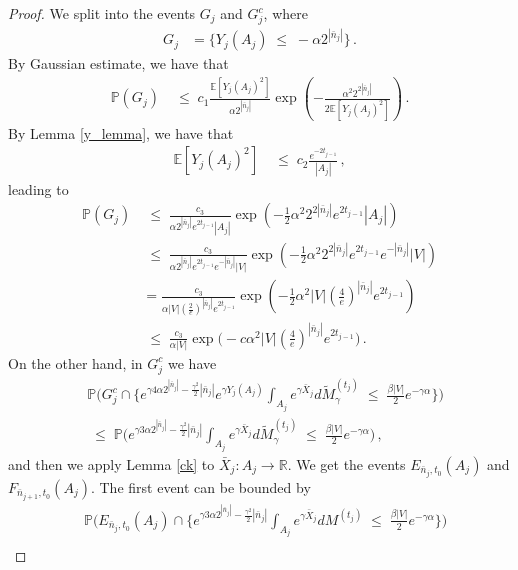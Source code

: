 \documentclass[10pt,a4paper]{amsart}
\newcommand{\E}{\mathbb{E}}
\newcommand{\Pb}{\P}
\newcommand{\R}{\mathbb{R}}
\newcommand{\ab}{|}
\renewcommand{\P}{\mathbb{P}}
\renewcommand{\leq}{\;\leqslant\;}                   %
\renewcommand{\tilde}{\widetilde}          %
\begin{document}
\begin{proof}

We split into the events $G_j$ and $G_j^c$, where
\begin{align*}
G_j &= \{ Y_j(A_j) \leq - \alpha 2^{|\bar n_j|} \}\,.
\end{align*}
By Gaussian estimate, we have that
\begin{align*}
\Pb(G_j) &\leq  c_1 \frac{\E[Y_j(A_j)^2]}{\alpha 2^{|\bar n_j|}} \exp \left( -  \frac{\alpha^2 2^{2|\bar n_j|}}{2 \E[ Y_j(A_j)^2]} \right)\,.
\end{align*}
By Lemma \ref{y_lemma}, we have that
\begin{align*}
\E[ Y_j(A_j)^2] & \leq c_2 \frac{e^{-2 t_{j-1}}}{\ab A_j \ab }\,,
\end{align*}
leading to 
\begin{align*}
\Pb(G_j) &\leq \frac{c_3}{\alpha 2^{|\bar n_j|} e^{2 t_{j-1}} |A_j|} \exp( - \tfrac 12 \alpha^2 2^{2|\bar n_j|} e^{2t_{j-1}} |A_j| ) \\
& \leq \frac{c_3}{\alpha 2^{|\bar n_j|} e^{2 t_{j-1}} e^{-|\bar n_j|}|V|} \exp(- \tfrac 12 \alpha^2 2^{2|\bar n_j|} e^{2 t_{j-1} } e^{-|\bar n_j|} \ab V \ab   ) \\
&  = \frac{c_3}{\alpha |V|  ( \frac{2}{e})^{|\bar n_j|} e^{2 t_{j-1}} } \exp(- \tfrac 12 \alpha^2 \ab V \ab  (\tfrac{4}{e})^{| \bar n_j|} e^{2t_{j-1}}) \\
& \leq \frac{c_3}{\alpha |V|} \exp \big( - c \alpha^2 |V| (\tfrac{4}{e})^{|\bar n_j|} e^{2 t_{j-1}} \big)\,.
\end{align*}
On the other hand, in $G_j^c$ we have 
\begin{align*}
& \Pb \big( G_j^c \cap \{ e^{\gamma 4 \alpha 2^{| \bar n_{j} | }  - \frac{\gamma^2}{2} |\bar n_{j}| } e^{\gamma Y_{j}(A_j)}\int_{A_{j}} e^{\gamma \bar X_{j}} d \tilde M_\gamma^{(t_{j})} \leq \tfrac{\beta \ab V \ab }{2} e^{-\gamma \alpha} \} \big) \\
& \leq \Pb \big( e^{\gamma 3 \alpha 2^{| \bar n_{j} | }  - \frac{\gamma^2}{2} |\bar n_{j}| } \int_{A_{j}} e^{\gamma \bar X_{j}} d \tilde M_\gamma^{(t_{j})} \leq \tfrac{\beta \ab V \ab }{2} e^{-\gamma \alpha} \big)\,,
\end{align*}
and then we apply Lemma \ref{ck} to $\bar X_j: A_j \to \R$. We get the events $E_{\bar n_j, t_0}(A_j)$ and $F_{\bar n_{j+1}, t_0}(A_j)$. The first event can be bounded by
\begin{align*}
& \Pb \big( E_{\bar n_j, t_0}(A_j) \cap \{ e^{\gamma 3 \alpha 2^{| \bar n_{j} | }  - \frac{\gamma^2}{2} |\bar n_{j}| } \int_{A_{j}} e^{\gamma \bar X_{j}} d M^{(t_{j})} \leq \tfrac{\beta \ab V \ab }{2} e^{-\gamma \alpha} \} \big) \\

\end{align*}
\end{proof}
\end{document}
